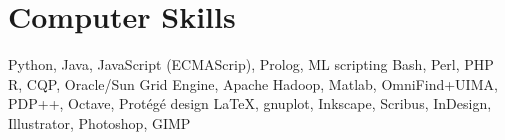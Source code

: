 \documentclass[11pt,a4paper]{moderncv}
\begin{document}
\section{Computer Skills}
        {Python, Java, JavaScript (ECMA\-Scrip), Prolog, ML}
    {scripting}
        {Bash, Perl, PHP}
        {R, CQP, Oracle/Sun Grid Engine, Apache Hadoop, Matlab, OmniFind+UIMA,
        PDP++, Octave, Prot\'{e}g\'{e}}
    {design}
        {\LaTeX, gnuplot, Inkscape, Scribus, InDesign, Illustrator, Photoshop, GIMP}%
\closesection{} %
%
%
%
%
%
%
\end{document}
